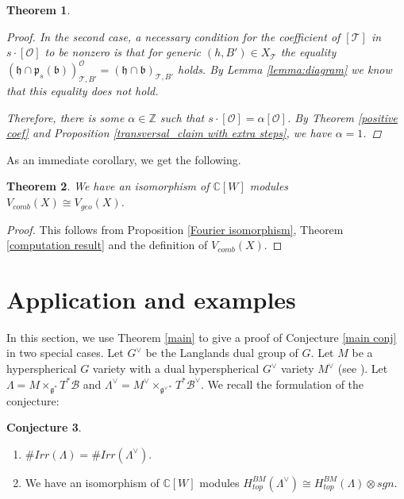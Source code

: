 \documentclass[12pt]{article}
\newcommand{\B}{\mathcal{B}}
\newcommand{\C}{\mathbb{C}}
\newcommand{\s}{\mathcal{O}}
\newcommand{\Z}{\mathbb{Z}}
\theoremstyle{plain}
\newtheorem{theorem}{Theorem}[section]
\theoremstyle{definition}
\newtheorem{conj}[theorem]{Conjecture}
\begin{document}
\begin{theorem}
\begin{proof}
        In the second case, a necessary condition for the coefficient of $[\mathcal{T}]$ in $s\cdot [\s]$ to be nonzero is that for generic $(h,B')\in X_{\mathcal{T}}$ the equality
 $(\mathfrak{h}\cap \mathfrak{p}_{s}(\mathfrak{b}))^{\mathcal{O}}_{\mathcal{T},B'}=(\mathfrak{h}\cap \mathfrak{b})_{\mathcal{T},B'}$ holds. By Lemma \ref{lemma:diagram} we know that this equality does not hold.

Therefore, there is some $\alpha\in \Z$ such that $s\cdot [\s]=\alpha[\s]$. By Theorem \ref{positive coef} and Proposition \ref{transversal_claim with extra steps}, we have $\alpha=1$.
    \end{proof}
\end{theorem}

As an immediate corollary, we get the following.

\begin{theorem}
    We have an isomorphism of $\C[W]$ modules $V_{comb}(X)\cong V_{geo}(X)$.
\end{theorem}

\begin{proof}
    This follows from Proposition \ref{Fourier isomorphism}, Theorem \ref{computation result} and the definition of $V_{comb}(X)$.
\end{proof}




\section{Application and examples}\label{s4}

In this section, we use Theorem \ref{main} to give a proof of Conjecture \ref{main conj} in two special cases. Let $G^\vee$ be the Langlands dual group of $G$. Let $M$ be a hyperspherical $G$ variety with a dual hyperspherical $G^\vee$ variety $M^\vee$ (see \cite{benzvi2024relativelanglandsduality}). Let $\Lambda=M\times_{\mathfrak{g}^*}T^*\B$ and $\Lambda^\vee=M^\vee\times_{\mathfrak{g}^{\vee *}}T^*\B^\vee$. We recall the formulation of the conjecture:

\begin{conj}\label{FGT conjecture}
\begin{enumerate}
    \item $\# Irr(\Lambda)=\# Irr(\Lambda^\vee)$.
    \item We have an isomorphism of $\C[W]$ modules $H^{BM}_{top}(\Lambda^\vee)\cong H^{BM}_{top}(\Lambda)\otimes sgn$.
\end{enumerate}
    
\end{conj}
\end{document}
